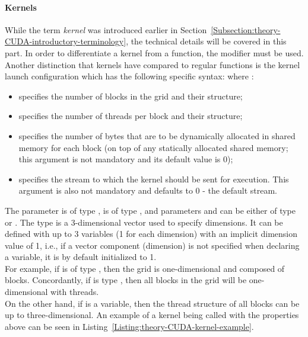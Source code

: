 \paragraph{Kernels}\label{Paragraph:theory-CUDA-c++-CUDA-extensions-kernels}
While the term \textit{kernel} was introduced earlier in Section~\ref{Subsection:theory-CUDA-introductory-terminology}, the technical details will be covered in this part. In order to differentiate a kernel from a function, the  modifier must be used. Another distinction that kernels have compared to regular functions is the kernel launch configuration which has the following specific syntax:   where \cite{NVIDIAMay2022, Cejka2020}:

\begin{itemize}
	\item {} specifies the number of blocks in the grid and their structure;
	\item {} specifies the number of threads per block and their structure;
	\item {} specifies the number of bytes that are to be dynamically allocated in shared memory for each block (on top of any statically allocated shared memory; this argument is not mandatory and its default value is 0);
	\item {} specifies the stream to which the kernel should be sent for execution. This argument is also not mandatory and defaults to 0 - the default stream.
\end{itemize}

The  parameter is of type ,  is of type , and parameters  and  can be either of type  or . The  type is a 3-dimensional  vector used to specify dimensions. It can be defined with up to 3 variables (1 for each dimension) with an implicit dimension value of 1, i.e., if a vector component (dimension) is not specified when declaring a  variable, it is by default initialized to 1. \\
For example, if  is of type , then the grid is one-dimensional and composed of  blocks. Concordantly, if  is type , then all blocks in the grid will be one-dimensional with  threads. \\
On the other hand, if  is a  variable, then the thread structure of all blocks can be up to three-dimensional. An example of a kernel being called with the properties above can be seen in Listing~\ref{Listing:theory-CUDA-kernel-example}.


